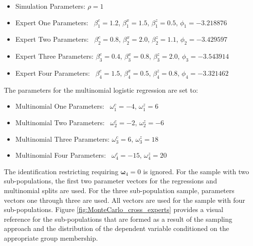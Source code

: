 \documentclass[12pt]{article}
\theoremstyle{definition}
\begin{document}
\begin{itemize}
  \item Simulation Parameters: $\rho = 1$
  \item Expert One Parameters: \, $\beta_{1}^{c} = 1.2$, \; $\beta_{1}^{x} = 1.5$, \; $\beta_{1}^{z} = 0.5$, \; $\phi_{1} = -3.218876$
  \item Expert Two Parameters: \, $\beta_{2}^{c} = 0.8$, \; $\beta_{2}^{x} = 2.0$, \; $\beta_{2}^{z} = 1.1$, \; $\phi_{2} = -3.429597$
  \item Expert Three Parameters: $\beta_{3}^{c} = 0.4$, \; $\beta_{3}^{x} = 0.8$, \; $\beta_{3}^{z} = 2.0$, \; $\phi_{3} = -3.543914$
  \item Expert Four Parameters: \, $\beta_{4}^{c} = 1.5$, \; $\beta_{4}^{x} = 0.5$, \; $\beta_{4}^{z} = 0.8$, \; $\phi_{4} = -3.321462$
\end{itemize}

The parameters for the multinomial logistic regression are set to:

\begin{itemize}
  \item Multinomial One Parameters: \, $\omega_{1}^{c} = -4$, \; $\omega_{1}^{z} = 6$
  \item Multinomial Two Parameters: \, $\omega_{2}^{c} = -2$, \; $\omega_{2}^{z} = -6$
  \item Multinomial Three Parameters: $\omega_{3}^{c} = 6$, \; $\omega_{3}^{z} = 18$
  \item Multinomial Four Parameters: \, $\omega_{4}^{c} = -15$, \; $\omega_{4}^{z} = 20$
\end{itemize}

The identification restricting requiring $\boldsymbol{\omega}_{4} = 0$ is ignored. For the sample with two sub-populations, the first two parameter vectors for the regressions and multinomial splits are used. For the three sub-population sample, parameters vectors one through three are used. All vectors are used for the sample with four sub-populations. Figure \ref{fig:MonteCarlo_cross_experts} provides a visual reference for the sub-populations that are formed as a result of the sampling approach and the distribution of the dependent variable conditioned on the appropriate group membership.

\bigskip 
\end{document}
